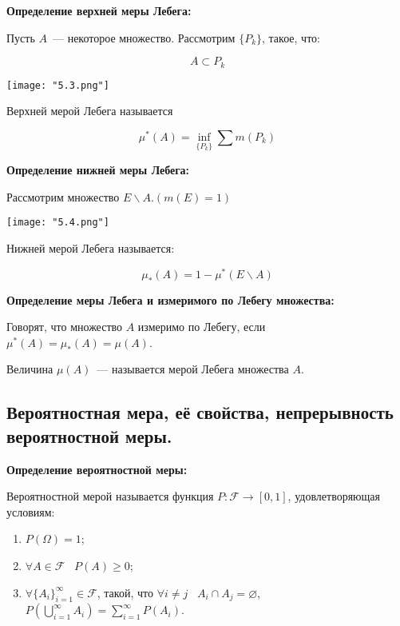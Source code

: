 \textbf{Определение верхней меры Лебега:}
    \smallskip    

    Пусть $A$~--- некоторое множество. Рассмотрим $\{P_k\}$, такое, что:

    \[
        A \subset P_k
    \]

    \begin{center}
        \texttt{[image: "5.3.png"]}
    \end{center}

    Верхней мерой Лебега называется 

    \[
        \mu^{*}(A) = \inf_{\{P_k\}} \sum m(P_k)
    \]
    \bigskip

\textbf{Определение нижней меры Лебега:}
    \smallskip
    
    Рассмотрим множество $E \backslash A. (m(E) = 1)$

    \begin{center}
        \texttt{[image: "5.4.png"]}
    \end{center}

    Нижней мерой Лебега называется:

    \[
        \mu_{*}(A) = 1 - \mu^{*}(E \backslash A)  
    \]
    \bigskip
    
\textbf{Определение меры Лебега и измеримого по Лебегу множества:}
    \smallskip
    
    Говорят, что множество $A$ измеримо по Лебегу, если $\mu^{*}(A) =
    \mu_{*}(A) = \mu (A)$.

    Величина $\mu(A)$~--- называется мерой Лебега множества $A$.

\subsection{Вероятностная мера, её свойства, непрерывность вероятностной меры.}

\textbf{Определение вероятностной меры:}
    \smallskip

    Вероятностной мерой называется функция $P : \mathcal{F} \to [0, 1]$,
    удовлетворяющая условиям:

    \begin{enumerate}
        \item{$P(\Omega) = 1$;}
        \item{$\forall A \in \mathcal{F} \;\;\; P(A) \geq 0$;}
        \item{$\forall \{A_i\}^{\infty}_{i = 1} \in \mathcal{F}$,
        такой, что $\forall i \neq j \;\;\; A_i \cap A_j = \varnothing$,
        $P\left(\bigcup\limits^{\infty}_{i = 1}A_i\right) = \sum\limits^{\infty}_{i = 1} P(A_i)$.}
    \end{enumerate}
    \bigskip

